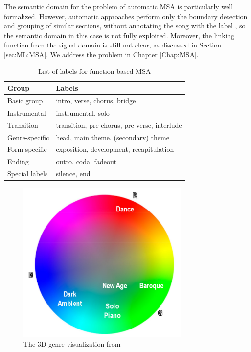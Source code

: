 The semantic domain for the problem of automatic MSA is particularly well formalized. However, automatic approaches perform only the boundary detection and grouping of similar sections, without annotating the song with the label \cite{ullrich2014boundary,Nieto2D,Nieto2016,NietoCNMF}, so the semantic domain in this case is not fully exploited. Moreover, the linking function from the signal domain is still not clear, as discussed in Section \ref{sec:ML:MSA}. We address the problem in Chapter \ref{Chap:MSA}.

\begin{table}[tbp]
\caption{List of labels for function-based MSA}
\label{tab:HLFs:MSAfunctions}
	\centering
	\large
	\bgroup
	\def\arraystretch{1.5}
	\begin{tabular}{||p{}|p{}||}
		\hline
		\hline
		\textbf{Group} & \textbf{Labels} \\
		\hline
		\hline
		Basic group & intro, verse, chorus, bridge\\
		\hline
		Instrumental & instrumental, solo\\
		\hline
		Transition & transition, pre-chorus, pre-verse, interlude\\
		\hline
		Genre-specific & head, main theme, (secondary) theme\\
		\hline
		Form-specific & exposition, development, recapitulation\\
		\hline
		Ending & outro, coda, fadeout\\
		\hline
		Special labels & silence, end\\
		\hline
		\hline
	\end{tabular}
\egroup

\end{table}

 \begin{figure}[tbp]
    \begin{center}
      \includegraphics[width=8.5cm]{img/HLFs/triangleB}
    \end{center}
  \caption{The 3D genre visualization from \cite{Prandi2009}}
  \label{fig:HLFs:prandi}
  \end{figure}


